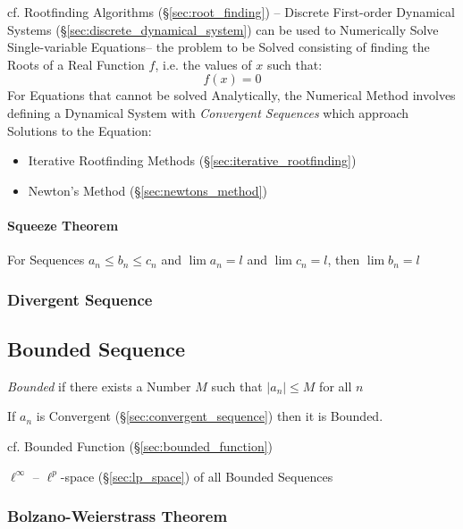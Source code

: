 \fist cf. Rootfinding Algorithms (\S\ref{sec:root_finding}) -- Discrete
First-order Dynamical Systems (\S\ref{sec:discrete_dynamical_system}) can be
used to Numerically Solve Single-variable Equations-- the problem to be Solved
consisting of finding the Roots of a Real Function $f$, i.e. the values of $x$
such that:
\[
  f(x) = 0
\]
For Equations that cannot be solved Analytically, the Numerical Method involves
defining a Dynamical System with \emph{Convergent Sequences} which approach
Solutions to the Equation:
\begin{itemize}
  \item Iterative Rootfinding Methods (\S\ref{sec:iterative_rootfinding})
  \item Newton's Method (\S\ref{sec:newtons_method})
\end{itemize}



\paragraph{Squeeze Theorem}\label{sec:squeeze_theorem}\hfill

For Sequences $a_n \leq b_n \leq c_n$ and $\lim a_n = l$ and $\lim c_n
= l$, then $\lim b_n = l$



\subsubsection{Divergent Sequence}\label{sec:divergent_sequence}



\subsection{Bounded Sequence}\label{sec:bounded_sequence}

\emph{Bounded} if there exists a Number $M$ such that $|a_n| \leq M$ for all $n$

If $a_n$ is Convergent (\S\ref{sec:convergent_sequence}) then it is
Bounded.

\fist cf. Bounded Function (\S\ref{sec:bounded_function})

$\ell^\infty$ -- $\ell^p$-space (\S\ref{sec:lp_space}) of all Bounded Sequences



\subsubsection{Bolzano-Weierstrass Theorem}\label{sec:bolzano_weierstrass}

